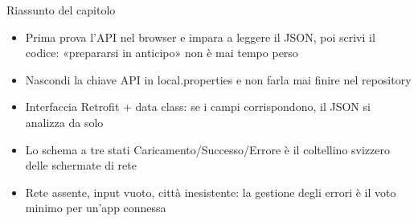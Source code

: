 \begin{tcbsummary}{Riassunto del capitolo}
\begin{itemize}
  \item Prima prova l'API nel browser e impara a leggere il JSON, poi scrivi il codice: «prepararsi in anticipo» non è mai tempo perso
  \item Nascondi la chiave API in local.properties e non farla mai finire nel repository
  \item Interfaccia Retrofit + data class: se i campi corrispondono, il JSON si analizza da solo
  \item Lo schema a tre stati Caricamento/Successo/Errore è il coltellino svizzero delle schermate di rete
  \item Rete assente, input vuoto, città inesistente: la gestione degli errori è il voto minimo per un'app connessa
\end{itemize}

\end{tcbsummary}
